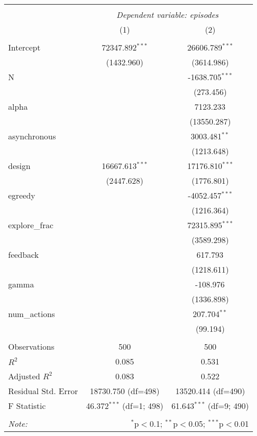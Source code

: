 \begin{table}[!htbp] \centering
\begin{tabular}{@{\extracolsep{5pt}}lcc}
\\[-1.8ex]\hline
\hline \\[-1.8ex]
& \multicolumn{2}{c}{\textit{Dependent variable: episodes}} \
\cr \cline{2-3}
\\[-1.8ex] & (1) & (2) \\
\hline \\[-1.8ex]
 Intercept & 72347.892$^{***}$ & 26606.789$^{***}$ \\
& (1432.960) & (3614.986) \\
 N & & -1638.705$^{***}$ \\
& & (273.456) \\
 alpha & & 7123.233$^{}$ \\
& & (13550.287) \\
 asynchronous & & 3003.481$^{**}$ \\
& & (1213.648) \\
 design & 16667.613$^{***}$ & 17176.810$^{***}$ \\
& (2447.628) & (1776.801) \\
 egreedy & & -4052.457$^{***}$ \\
& & (1216.364) \\
 explore_frac & & 72315.895$^{***}$ \\
& & (3589.298) \\
 feedback & & 617.793$^{}$ \\
& & (1218.611) \\
 gamma & & -108.976$^{}$ \\
& & (1336.898) \\
 num_actions & & 207.704$^{**}$ \\
& & (99.194) \\
\hline \\[-1.8ex]
 Observations & 500 & 500 \\
 $R^2$ & 0.085 & 0.531 \\
 Adjusted $R^2$ & 0.083 & 0.522 \\
 Residual Std. Error & 18730.750 (df=498) & 13520.414 (df=490) \\
 F Statistic & 46.372$^{***}$ (df=1; 498) & 61.643$^{***}$ (df=9; 490) \\
\hline
\hline \\[-1.8ex]
\textit{Note:} & \multicolumn{2}{r}{$^{*}$p$<$0.1; $^{**}$p$<$0.05; $^{***}$p$<$0.01} \\
\end{tabular}
\end{table}